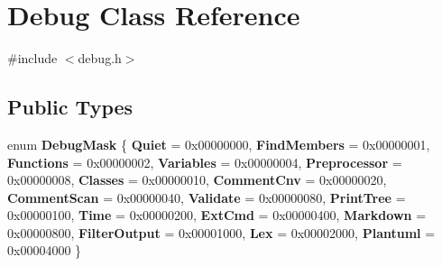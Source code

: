 \hypertarget{class_debug}{}\section{Debug Class Reference}
\label{class_debug}


{\ttfamily \#include $<$debug.\+h$>$}

\subsection*{Public Types}
\begin{DoxyCompactItemize}
\item 
\mbox{\label{class_debug_a9e0b892a8030a4f64076850777991c96}} 
enum {\bfseries Debug\+Mask} \{ \newline
{\bfseries Quiet} = 0x00000000, 
{\bfseries Find\+Members} = 0x00000001, 
{\bfseries Functions} = 0x00000002, 
{\bfseries Variables} = 0x00000004, 
\newline
{\bfseries Preprocessor} = 0x00000008, 
{\bfseries Classes} = 0x00000010, 
{\bfseries Comment\+Cnv} = 0x00000020, 
{\bfseries Comment\+Scan} = 0x00000040, 
\newline
{\bfseries Validate} = 0x00000080, 
{\bfseries Print\+Tree} = 0x00000100, 
{\bfseries Time} = 0x00000200, 
{\bfseries Ext\+Cmd} = 0x00000400, 
\newline
{\bfseries Markdown} = 0x00000800, 
{\bfseries Filter\+Output} = 0x00001000, 
{\bfseries Lex} = 0x00002000, 
{\bfseries Plantuml} = 0x00004000
 \}
\end{DoxyCompactItemize}
